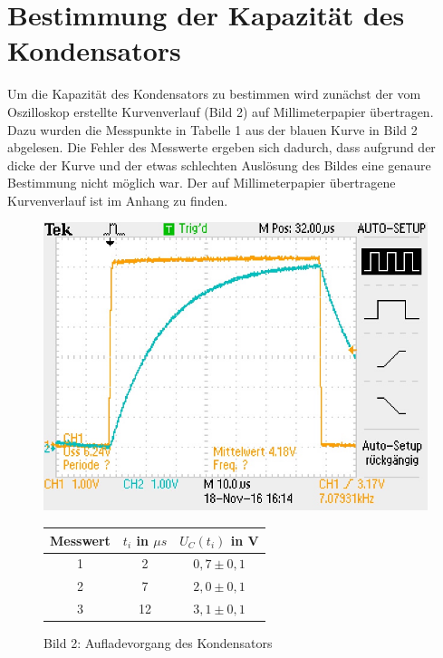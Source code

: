 \section{Bestimmung der Kapazität des Kondensators}
Um die Kapazität des Kondensators zu bestimmen wird zunächst der vom Oszilloskop erstellte Kurvenverlauf (Bild 2) auf Millimeterpapier übertragen. Dazu wurden die Messpunkte in Tabelle 1 aus der blauen Kurve in Bild 2 abgelesen. Die Fehler des Messwerte ergeben sich dadurch, dass aufgrund der dicke der Kurve und der etwas schlechten Auslösung des Bildes eine genaure Bestimmung nicht möglich war. Der auf Millimeterpapier übertragene Kurvenverlauf ist im Anhang zu finden.
\begin{figure}[h]
    \centering
    \begin{minipage}[h]{0.45\linewidth}
        \centering
        \includegraphics[width=\linewidth]{F0005TEK.jpg}
        \caption*{Bild 2: \small Aufladevorgang des Kondensators}
    \end{minipage}
    \hspace{0.2cm}
    \begin{minipage}[h]{0.45\linewidth}
        \centering
        \begin{tabular}{|c|c|c|}
            \hline
            Messwert& $t_i$ in $\mu s$ & $U_C(t_i)$ in V \\
            \hline
            \hline
            1 & 2 & $0,7\pm0,1$ \\
            \hline
            2 & 7 & $2,0\pm0,1$ \\
            \hline
            3 & 12 & $3,1\pm0,1$ \\

\end{tabular}
\end{minipage}
\end{figure}
